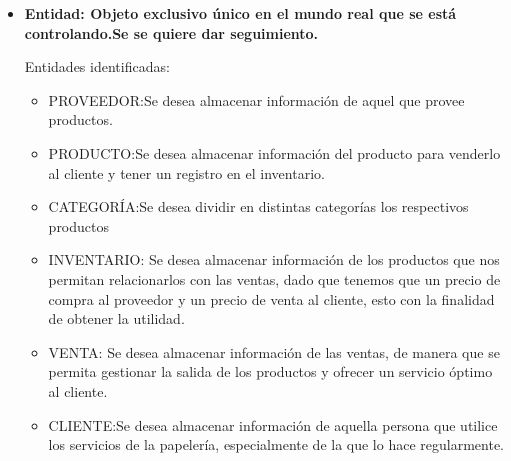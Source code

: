 \documentclass[30pt,fleqn]{article}
\begin{document}
\begin{itemize}
\vspace{5mm} %
\item\textbf{Entidad: Objeto exclusivo único en el mundo real que se está controlando.Se se quiere dar seguimiento.}

\vspace{5mm} %

Entidades identificadas:
\begin{itemize}

\vspace{5mm} %
\item PROVEEDOR:Se desea almacenar información de aquel que provee productos. 

\vspace{5mm} %


\item PRODUCTO:Se desea almacenar información del producto para venderlo al cliente y tener un registro en el inventario.

\vspace{5mm} %

\item CATEGORÍA:Se desea dividir en distintas categorías los respectivos productos

\vspace{5mm} %

\item INVENTARIO: Se desea almacenar información de los productos que nos permitan relacionarlos con las ventas, dado que tenemos que un precio de compra al proveedor y un precio de venta al cliente, esto con la finalidad de obtener la utilidad.

\vspace{5mm} %

\item VENTA: Se desea almacenar información de las ventas, de manera que se permita gestionar la salida de los productos y ofrecer un servicio óptimo al cliente.

\vspace{5mm} %

\item CLIENTE:Se desea almacenar información de aquella persona que utilice los servicios de la papelería, especialmente de la que lo hace regularmente.

\vspace{5mm} %
\end{itemize}
\vspace{10mm} %


\end{itemize}
\end{document}
